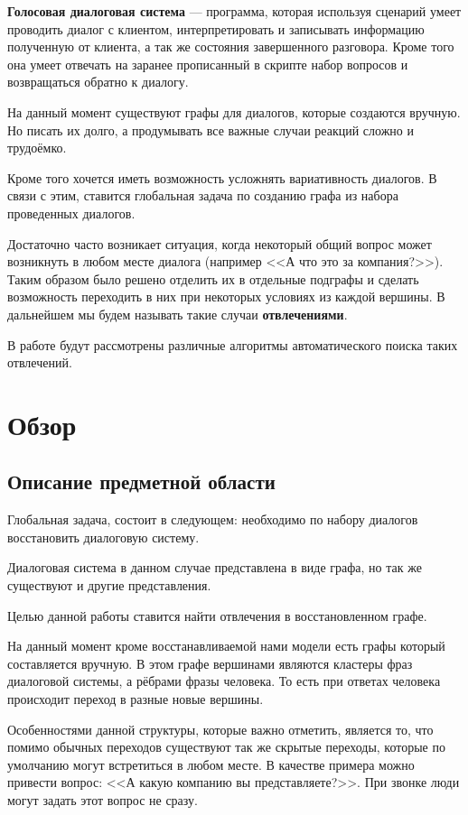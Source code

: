 \documentclass[specification,annotation]{itmo-student-thesis}
\begin{document}
	\textbf{Голосовая диалоговая система} — программа, которая используя сценарий умеет проводить диалог с клиентом, интерпретировать и записывать  информацию полученную от клиента, а так же состояния завершенного разговора. Кроме того она умеет отвечать на заранее прописанный в скрипте набор вопросов и возвращаться обратно к диалогу.
	
	На данный момент существуют графы для диалогов, которые создаются вручную. Но писать их долго, а продумывать все важные случаи реакций сложно и трудоёмко. 
	
	Кроме того хочется иметь возможность усложнять вариативность диалогов. В связи с этим, ставится глобальная задача по созданию графа из набора проведенных диалогов. 
	
	Достаточно часто возникает ситуация, когда некоторый общий вопрос может возникнуть в любом месте диалога (например <<А что это за компания?>>). Таким образом было решено отделить их в отдельные подграфы и сделать возможность переходить в них при некоторых условиях из каждой вершины. В дальнейшем мы будем называть такие случаи \textbf{отвлечениями}.
	
	В работе будут рассмотрены различные алгоритмы автоматического поиска таких отвлечений.
	
	\chapter{Обзор}
	\section{Описание предметной области}
	Глобальная задача, состоит в следующем: необходимо по набору диалогов восстановить диалоговую систему.
	
	Диалоговая система в данном случае представлена в виде графа, но так же существуют и другие представления.
	
	Целью данной работы ставится найти отвлечения в восстановленном графе.
	
	На данный момент кроме восстанавливаемой нами модели есть графы который составляется вручную. В этом графе вершинами являются кластеры фраз диалоговой системы, а рёбрами фразы человека. То есть при ответах человека происходит переход в разные новые вершины.
	
	Особенностями данной структуры, которые важно отметить, является то, что помимо обычных переходов существуют так же скрытые переходы, которые по умолчанию могут встретиться в любом месте. В качестве примера можно привести вопрос: <<А какую компанию вы представляете?>>. При звонке люди могут задать этот вопрос не сразу.
	
\end{document}
